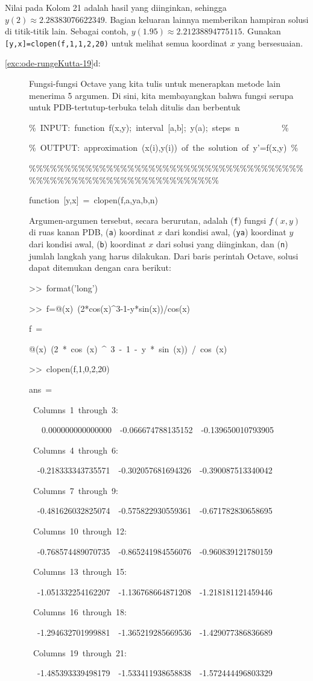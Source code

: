 Nilai pada Kolom 21 adalah hasil yang diinginkan, sehingga $y(2)\approx2.28383076622349$.
Bagian keluaran lainnya memberikan hampiran solusi di titik-titik
lain. Sebagai contoh, $y(1.95)\approx2.21238894775115$. Gunakan \texttt{{[}y,x{]}=clopen(f,1,1,2,20)}
untuk melihat semua koordinat $x$ yang bersesuaian.
\begin{description}
\item [{\ref{exc:ode-rungeKutta-19}d:}] Fungsi-fungsi Octave yang kita
tulis untuk menerapkan metode lain menerima 5 argumen. Di sini, kita
membayangkan bahwa fungsi serupa untuk PDB-tertutup-terbuka telah
ditulis dan berbentuk

\begin{lyxcode}
\%~INPUT:~function~f(x,y);~interval~{[}a,b{]};~y(a);~steps~n~~~~~~~~~~\%

\%~OUTPUT:~approximation~(x(i),y(i))~of~the~solution~of~y'=f(x,y)~\%

\%\%\%\%\%\%\%\%\%\%\%\%\%\%\%\%\%\%\%\%\%\%\%\%\%\%\%\%\%\%\%\%\%\%\%\%\%\%\%\%\%\%\%\%\%\%\%\%\%\%\%\%\%\%\%\%\%\%\%\%\%\%\%\%\%\%

function~{[}y,x{]}~=~clopen(f,a,ya,b,n)~
\end{lyxcode}
Argumen-argumen tersebut, secara berurutan, adalah (\texttt{f}) fungsi
$f(x,y)$ di ruas kanan PDB, (\texttt{a}) koordinat $x$ dari kondisi
awal, (\texttt{ya}) koordinat $y$ dari kondisi awal, (\texttt{b})
koordinat $x$ dari solusi yang diinginkan, dan (\texttt{n}) jumlah
langkah yang harus dilakukan. Dari baris perintah Octave, solusi dapat
ditemukan dengan cara berikut:
\begin{lyxcode}
>\textcompwordmark >~format('long')

>\textcompwordmark >~f=@(x)~(2{*}cos(x)\textasciicircum 3-1-y{*}sin(x))/cos(x)

f~=

@(x)~(2~{*}~cos~(x)~\textasciicircum ~3~-~1~-~y~{*}~sin~(x))~/~cos~(x)

>\textcompwordmark >~clopen(f,1,0,2,20)

ans~=

~Columns~1~through~3:

~~~0.000000000000000~~-0.066674788135152~~-0.139650010793905

~Columns~4~through~6:

~~-0.218333343735571~~-0.302057681694326~~-0.390087513340042

~Columns~7~through~9:

~~-0.481626032825074~~-0.575822930559361~~-0.671782830658695

~Columns~10~through~12:

~~-0.768574489070735~~-0.865241984556076~~-0.960839121780159

~Columns~13~through~15:

~~-1.051332254162207~~-1.136768664871208~~-1.218181121459446

~Columns~16~through~18:

~~-1.294632701999881~~-1.365219285669536~~-1.429077386836689

~Columns~19~through~21:

~~-1.485393339498179~~-1.533411938658838~~-1.572444496803329
\end{lyxcode}
\end{description}
